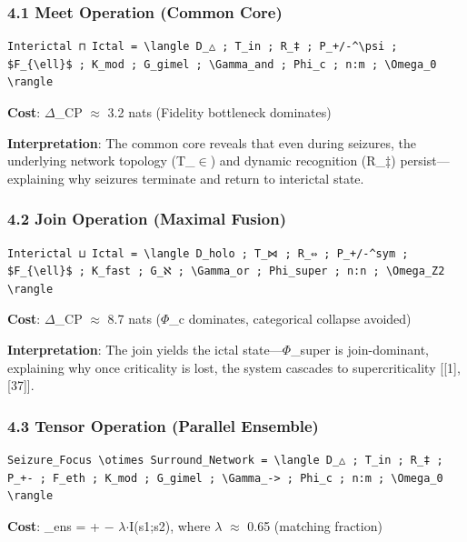\documentclass[12pt,a4paper]{article}
\begin{document}
\subsubsection{\textbf{4.1 Meet Operation (Common Core)}}

\begin{lstlisting}
Interictal ⊓ Ictal = \langle D_△ ; T_in ; R_‡ ; P_+/-^\psi ; $F_{\ell}$ ; K_mod ; G_gimel ; \Gamma_and ; Phi_c ; n:m ; \Omega_0 \rangle
\end{lstlisting}

\textbf{Cost}: $\Delta$\xi\_CP $\approx$ 3.2 nats (Fidelity bottleneck dominates)

\textbf{Interpretation}: The common core reveals that even during seizures, the underlying network topology (T\_$\in$) and dynamic recognition (R\_‡) persist---explaining why seizures terminate and return to interictal state.

\subsubsection{\textbf{4.2 Join Operation (Maximal Fusion)}}

\begin{lstlisting}
Interictal ⊔ Ictal = \langle D_holo ; T_⋈ ; R_⇔ ; P_+/-^sym ; $F_{\ell}$ ; K_fast ; G_ℵ ; \Gamma_or ; Phi_super ; n:n ; \Omega_Z2 \rangle
\end{lstlisting}

\textbf{Cost}: $\Delta$\xi\_CP $\approx$ 8.7 nats ($\Phi$\_c dominates, categorical collapse avoided)

\textbf{Interpretation}: The join yields the ictal state---$\Phi$\_super is join-dominant, explaining why once criticality is lost, the system cascades to supercriticality {[}{[}1{]}, {[}37{]}{]}.

\subsubsection{\textbf{4.3 Tensor Operation (Parallel Ensemble)}}

\begin{lstlisting}
Seizure_Focus \otimes Surround_Network = \langle D_△ ; T_in ; R_‡ ; P_+- ; F_eth ; K_mod ; G_gimel ; \Gamma_-> ; Phi_c ; n:m ; \Omega_0 \rangle
\end{lstlisting}

\textbf{Cost}: \xi\_ens =  +  $-$ $\lambda$$\cdot$I(s1;s2), where $\lambda$ $\approx$ 0.65 (matching fraction)
\end{document}
